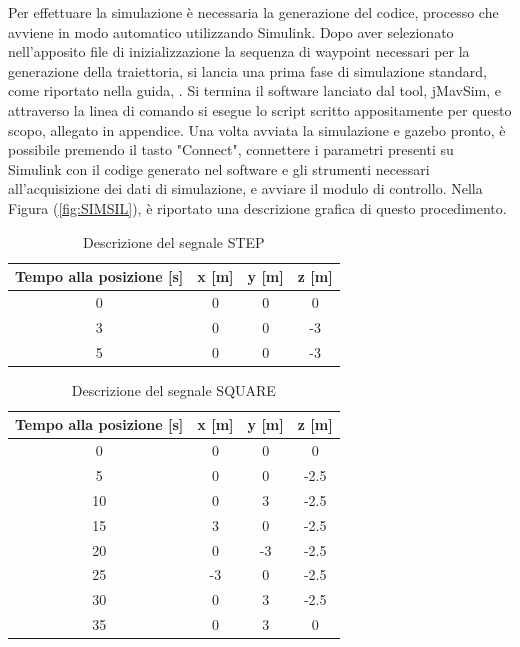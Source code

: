Per effettuare la simulazione è necessaria la generazione del codice, processo che avviene in modo automatico utilizzando Simulink. Dopo aver selezionato nell'apposito file di inizializzazione la sequenza di waypoint necessari per la generazione della traiettoria, si lancia una prima fase di simulazione standard, come riportato nella guida, \cite{px4Guide}. Si termina il software lanciato dal tool, jMavSim, e attraverso la linea di comando si esegue lo script scritto appositamente per questo scopo, allegato in appendice.
Una volta avviata la simulazione e gazebo pronto, è possibile premendo il tasto "Connect", connettere i parametri presenti su Simulink con il codige generato nel software e gli strumenti necessari all'acquisizione dei dati di simulazione, e avviare il modulo di controllo. Nella Figura (\ref{fig:SIMSIL}), è riportato una descrizione grafica di questo procedimento.


\begin{table}
	\centering
	\begin{tabular}{c c c c}
		\hline
		Tempo alla posizione [s] &  x [m] & y [m] & z [m]\\
		\hline
		0 & 0 & 0 & 0 \\
		3 & 0 & 0 & -3 \\
		5 & 0 & 0 & -3 \\
		\hline
	\end{tabular}	
	\caption{Descrizione del segnale STEP}
	\label{tab:STEP}
\end{table}

\begin{table}
	\centering
	\begin{tabular}{c c c c}
		\hline
		Tempo alla posizione [s] &  x [m] & y [m] & z [m]\\
		\hline
		0 & 0 & 0 & 0 \\
		5 & 0 & 0 & -2.5 \\
		10 & 0 & 3 & -2.5 \\
		15 & 3 & 0 & -2.5 \\
		20 & 0 & -3 & -2.5 \\
		25 & -3 & 0 & -2.5 \\
		30 & 0 & 3 & -2.5 \\
		35 & 0 & 3 & 0 \\
		\hline
	\end{tabular}	
	\caption{Descrizione del segnale SQUARE}
	\label{tab:SQUARE}
\end{table}

